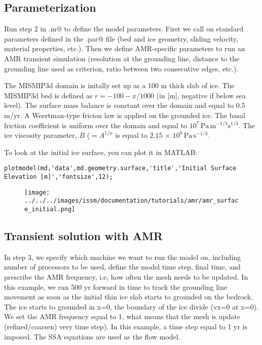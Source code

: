 \subsection{Parameterization}
Run step 2 in \verb@runme.m@ to define the model parameters. First we call on standard parameters defined in the \verb@mismip.par@ file (bed and ice geometry, sliding velocity, material properties, etc.). Then we define AMR-specific parameters to run an AMR transient simulation (resolution at the grounding line, distance to the grounding line used as criterion, ratio between two consecutive edges, etc.).

The MISMIP3d domain is initally set up as a 100 m thick slab of ice. The MISMIP3d bed is defined as $r=-100-x/1000$ (in [m], negative if below sea level). The surface mass balance is constant over the domain and equal to 0.5 m/yr. A Weertman-type fricion law is applied on the grounded ice. The basal friction coefficient is uniform over the domain and equal to $10^{7}\,\textrm{Pa}\,\textrm{m}^{-1/3}\textrm{s}^{1/3}$. The ice viscosity parameter, $B$ ($=A^{1/n}$ is equal to $2.15 \, \times \, 10^{8}\,\textrm{Pa}\,\textrm{s}^{-1/3}$.

To look at the initial ice surface, you can plot it in MATLAB:
\begin{verbatim}plotmodel(md,'data',md.geometry.surface,'title','Initial Surface Elevation [m]','fontsize',12);\end{verbatim}

\begin{figure}[H]
	\begin{center}
		\texttt{[image: ../../../images/issm/documentation/tutorials/amr/amr\_surface\_initial.png]}
	\end{center}
\end{figure}

\subsection{Transient solution with AMR}
In step 3, we specify which machine we want to run the model on, including number of processors to be used, define the model time step, final time, and prescribe the AMR frequency, i.e, how often the mesh needs to be updated. In this example, we run 500 yr forward in time to track the grounding line movement as soon as the initial thin ice slab starts to grounded on the bedrock. The ice starts to grounded in x=0, the boundary of the ice divide (vx=0 at x=0). We set the AMR frequency equal to 1, what means that the mesh is update (refined/coarsen) very time step). In this example, a time step equal to 1 yr is imposed. The SSA equations are used as the flow model.

